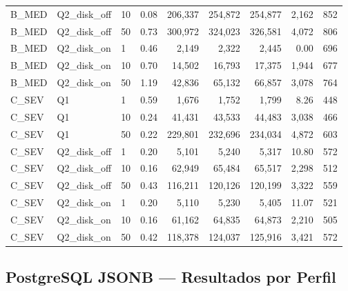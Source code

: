 \documentclass[12pt,a4paper]{article}
\begin{document}
\begin{longtable}{lllrrrrrr}
\rowcolor{warnbg}
B\_MED  & Q2\_disk\_off & 10 & 0.08 & 206{,}337  & 254{,}872 & 254{,}877 & 2{,}162 & 852 \\
\rowcolor{warnbg}
B\_MED  & Q2\_disk\_off & 50 & 0.73 & 300{,}972  & 324{,}023 & 326{,}581 & 4{,}072 & 806 \\
\rowcolor{warnbg}
B\_MED  & Q2\_disk\_on  & 1  & 0.46 & 2{,}149    & 2{,}322   & 2{,}445   & 0.00    & 696 \\
\rowcolor{warnbg}
B\_MED  & Q2\_disk\_on  & 10 & 0.70 & 14{,}502   & 16{,}793  & 17{,}375  & 1{,}944 & 677 \\
\rowcolor{warnbg}
B\_MED  & Q2\_disk\_on  & 50 & 1.19 & 42{,}836   & 65{,}132  & 66{,}857  & 3{,}078 & 764 \\
\midrule
\rowcolor{errbg}
C\_SEV  & Q1            & 1  & 0.59 & 1{,}676    & 1{,}752   & 1{,}799   & 8.26    & 448 \\
\rowcolor{errbg}
C\_SEV  & Q1            & 10 & 0.24 & 41{,}431   & 43{,}533  & 44{,}483  & 3{,}038 & 466 \\
\rowcolor{errbg}
C\_SEV  & Q1            & 50 & 0.22 & 229{,}801  & 232{,}696 & 234{,}034 & 4{,}872 & 603 \\
\rowcolor{errbg}
C\_SEV  & Q2\_disk\_off & 1  & 0.20 & 5{,}101    & 5{,}240   & 5{,}317   & 10.80   & 572 \\
\rowcolor{errbg}
C\_SEV  & Q2\_disk\_off & 10 & 0.16 & 62{,}949   & 65{,}484  & 65{,}517  & 2{,}298 & 512 \\
\rowcolor{errbg}
C\_SEV  & Q2\_disk\_off & 50 & 0.43 & 116{,}211  & 120{,}126 & 120{,}199 & 3{,}322 & 559 \\
\rowcolor{errbg}
C\_SEV  & Q2\_disk\_on  & 1  & 0.20 & 5{,}110    & 5{,}230   & 5{,}405   & 11.07   & 521 \\
\rowcolor{errbg}
C\_SEV  & Q2\_disk\_on  & 10 & 0.16 & 61{,}162   & 64{,}835  & 64{,}873  & 2{,}210 & 505 \\
\rowcolor{errbg}
C\_SEV  & Q2\_disk\_on  & 50 & 0.42 & 118{,}378  & 124{,}037 & 125{,}916 & 3{,}421 & 572 \\
\end{longtable}

\subsection{PostgreSQL JSONB — Resultados por Perfil}
\end{document}
